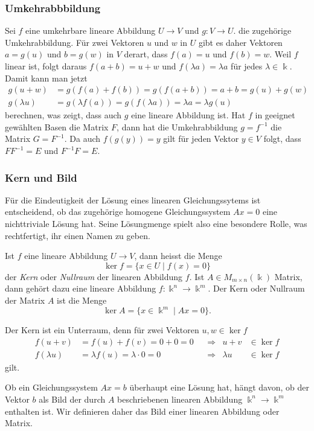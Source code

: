 \subsubsection{Umkehrabbbildung}
Sei $f$ eine umkehrbare lineare Abbildung $U\to V$ und $g\colon V\to U$.
die zugehörige Umkehrabbildung.
Für zwei Vektoren $u$ und $w$ in $U$ gibt es daher Vektoren $a=g(u)$
und $b=g(w)$ in $V$ derart, dass $f(a)=u$ und $f(b)=w$.
Weil $f$ linear ist, folgt daraus $f(a+b)=u+w$ und $f(\lambda a)=\lambda a$
für jedes $\lambda\in\Bbbk$.
Damit kann man jetzt 
\begin{align*}
g(u+w)&=g(f(a)+f(b)) = g(f(a+b)) = a+b = g(u)+g(w)
\\
g(\lambda u) &= g(\lambda f(a))=g(f(\lambda a)) = \lambda a = \lambda g(u)
\end{align*}
berechnen, was zeigt, dass auch $g$ eine lineare Abbildung ist.
Hat $f$ in geeignet gewählten Basen die Matrix $F$, dann hat die
Umkehrabbildung $g=f^{-1}$ die Matrix $G=F^{-1}$.
Da auch $f(g(y))=y$ gilt für jeden Vektor $y\in V$ folgt, dass $FF^{-1}=E$
und $F^{-1}F=E$.

\subsubsection{Kern und Bild}
Für die Eindeutigkeit der Lösung eines linearen Gleichungssytems
ist entscheidend, ob das zugehörige homogene Gleichungssystem $Ax=0$
eine nichttriviale Lösung hat.
Seine Lösungmenge spielt also eine besondere Rolle, was rechtfertigt,
ihr einen Namen zu geben.

\begin{definition}
%
Ist $f$ eine lineare Abbildung $U\to V$, dann heisst die Menge
\[
\ker f
=
\{x\in U\;|\; f(x)=0\}
\]
der {\em Kern} oder {\em Nullraum} der linearen Abbildung $f$.
Ist $A \in M_{m\times n}(\Bbbk)$ Matrix, dann gehört dazu eine lineare
Abbildung $f\colon\Bbbk^n\to\Bbbk^m$.
Der Kern oder Nullraum der Matrix $A$ ist die Menge
\[
\ker A
=
\{ x\in\Bbbk^m \;|\; Ax=0\}.
\]
\end{definition}

Der Kern ist ein Unterraum, denn für zwei Vektoren $u,w\in \ker f$ 
\[
\begin{aligned}
f(u+v)&=f(u) + f(v) = 0+0 = 0 &&\Rightarrow& u+v&\in\ker f\\
f(\lambda u)&=\lambda f(u) = \lambda\cdot 0=0&&\Rightarrow& \lambda u&\in\ker f
\end{aligned}
\]
gilt.

Ob ein Gleichungssystem $Ax=b$ überhaupt eine Lösung hat, hängt davon,
ob der Vektor $b$ als Bild der durch $A$ beschriebenen linearen Abbildung
$\Bbbk^n \to \Bbbk^m$ enthalten ist.
Wir definieren daher das Bild einer linearen Abbildung oder Matrix.

